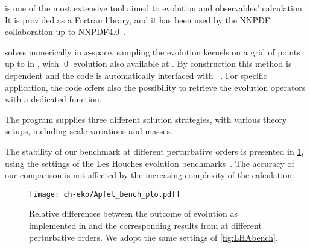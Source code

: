 \apfel{} \cite{Bertone:2013vaa} is one of the most extensive tool aimed to
\pdf{}  evolution and \dis{} observables' calculation. It is provided as a
Fortran library, and it has been used by the NNPDF collaboration up to
NNPDF4.0~\cite{NNPDF:2021njg}.

\apfel{} solves \dglap{} numerically in $x$-space, sampling the evolution
kernels on a grid of points up to \nnlo{} in \qcd{}, with \qed{} evolution also
available at \lo{}.
By construction this method is \pdf{} dependent and the code is automatically
interfaced with \lhapdf{}~\cite{Buckley:2014ana}. For specific application,
the code offers also the possibility to retrieve the evolution operators
with a dedicated function.

The program supplies three different solution strategies, with various theory
setups, including scale variations and \msbar{} masses.

The stability of our benchmark at different perturbative orders is presented in \cref{fig:Apfelbench_pto},
using the settings of the Les Houches \pdf{} evolution benchmarks~\cite{Giele:2002hx,Dittmar:2005ed}.
The accuracy of our comparison is not affected by the increasing complexity
of the calculation.

\begin{figure}
    \texttt{[image: ch-eko/Apfel\_bench\_pto.pdf]}
    \caption{Relative differences between the outcome of evolution as
        implemented in \eko{} and the corresponding results from \apfel{} at
        different perturbative orders.  We adopt the same settings of
        \cref{fig:LHAbench}.}
    \label{fig:Apfelbench_pto}
\end{figure}
